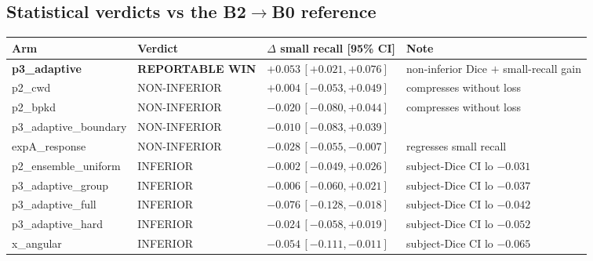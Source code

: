 \documentclass[11pt]{article}
\newcommand{\win}[1]{\textcolor{wingreen}{\textbf{#1}}}
\newcommand{\lose}[1]{\textcolor{losered}{#1}}
\newcommand{\tabnote}[1]{\par\vspace{2pt}{\footnotesize\itshape #1}\par}
\begin{document}
\tabnote{Locked re-evaluation, 185 images. Single seed (42) per arm. Because the teachers are
re-scored here too, their numbers differ slightly from \S5.3 --- compare within this table only.}

\subsection{Statistical verdicts vs the B2$\to$B0 reference}

\begin{center}\footnotesize
\begin{tabular}{>{\raggedright\arraybackslash}p{3.4cm} >{\raggedright\arraybackslash}p{2.7cm}
                >{\raggedleft\arraybackslash}p{3.4cm} >{\raggedright\arraybackslash}p{4.1cm}}
\toprule
\textbf{Arm} & \textbf{Verdict} & $\Delta$ \textbf{small recall [95\% CI]} & \textbf{Note} \\
\midrule
\win{p3\_adaptive}     & \win{REPORTABLE WIN} & $+0.053\,[+0.021,+0.076]$ &
  non-inferior Dice $+$ small-recall gain \\
p2\_cwd                & NON-INFERIOR & $+0.004\,[-0.053,+0.049]$ & compresses without loss \\
p2\_bpkd               & NON-INFERIOR & $-0.020\,[-0.080,+0.044]$ & compresses without loss \\
p3\_adaptive\_boundary & NON-INFERIOR & $-0.010\,[-0.083,+0.039]$ & \\
expA\_response         & NON-INFERIOR & $-0.028\,[-0.055,-0.007]$ & regresses small recall \\
p2\_ensemble\_uniform  & \lose{INFERIOR} & $-0.002\,[-0.049,+0.026]$ & subject-Dice CI lo $-0.031$ \\
p3\_adaptive\_group    & \lose{INFERIOR} & $-0.006\,[-0.060,+0.021]$ & subject-Dice CI lo $-0.037$ \\
p3\_adaptive\_full     & \lose{INFERIOR} & $-0.076\,[-0.128,-0.018]$ & subject-Dice CI lo $-0.042$ \\
p3\_adaptive\_hard     & \lose{INFERIOR} & $-0.024\,[-0.058,+0.019]$ & subject-Dice CI lo $-0.052$ \\
x\_angular             & \lose{INFERIOR} & $-0.054\,[-0.111,-0.011]$ & subject-Dice CI lo $-0.065$ \\
\bottomrule
\end{tabular}
\end{center}

\tabnote{"$\Delta$ small recall" is (arm $-$ reference) recall on small bruises. INFERIOR verdicts
are driven by the primary gate: the lower bound of the paired subject-Dice CI falls below the
$-0.03$ non-inferiority margin.}
\end{document}
